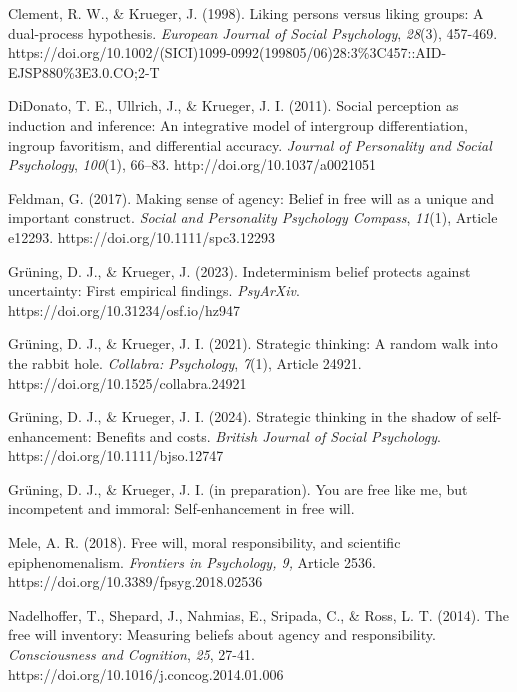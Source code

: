 \documentclass[authordate, anecdote]{jote-new-article}
\begin{document}
	Clement, R. W., \& Krueger, J. (1998). Liking persons versus liking groups: A dual-process hypothesis. \emph{European Journal of Social Psychology},\emph{ 28}(3), 457-469. https://doi.org/10.1002/(SICI)1099-0992(199805/06)28:3\%3C457::AID-EJSP880\%3E3.0.CO;2-T



	DiDonato, T. E., Ullrich, J., \& Krueger, J. I. (2011). Social perception as induction and inference: An integrative model of intergroup differentiation, ingroup favoritism, and differential accuracy. \emph{Journal of Personality and Social Psychology}, \emph{100}(1), 66--83. http://doi.org/10.1037/a0021051



	Feldman, G. (2017). Making sense of agency: Belief in free will as a unique and important construct. \emph{Social and Personality Psychology Compass}, \emph{11}(1), Article e12293. https://doi.org/10.1111/spc3.12293



	Grüning, D. J., \& Krueger, J. (2023). Indeterminism belief protects against uncertainty: First empirical findings. \emph{PsyArXiv}. https://doi.org/10.31234/osf.io/hz947



	Grüning, D. J., \& Krueger, J. I. (2021). Strategic thinking: A random walk into the rabbit hole. \emph{Collabra: Psychology}, \emph{7}(1), Article 24921. https://doi.org/10.1525/collabra.24921



	Grüning, D. J., \& Krueger, J. I. (2024). Strategic thinking in the shadow of self-enhancement: Benefits and costs. \emph{British Journal of Social Psychology}. https://doi.org/10.1111/bjso.12747



	Grüning, D. J., \& Krueger, J. I. (in preparation). You are free like me, but incompetent and immoral: Self-enhancement in free will.



	Mele, A. R. (2018). Free will, moral responsibility, and scientific epiphenomenalism. \emph{Frontiers in Psychology, 9,} Article 2536. https://doi.org/10.3389/fpsyg.2018.02536



	Nadelhoffer, T., Shepard, J., Nahmias, E., Sripada, C., \& Ross, L. T. (2014). The free will inventory: Measuring beliefs about agency and responsibility. \emph{Consciousness and Cognition}, \emph{25}, 27-41. https://doi.org/10.1016/j.concog.2014.01.006
\end{document}
